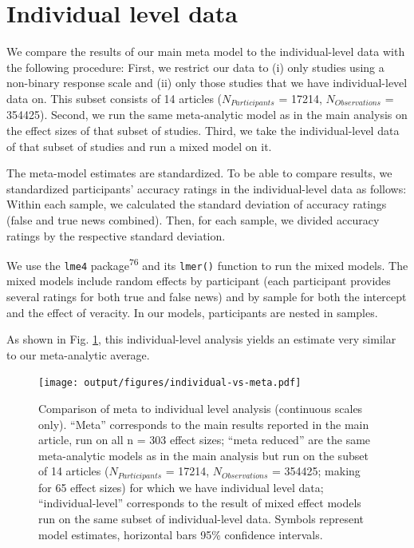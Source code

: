 \documentclass[
  doc,floatsintext]{apa6}
\begin{document}
\FloatBarrier

\clearpage

\section{Individual level data}\label{individual-level}

\FloatBarrier

We compare the results of our main meta model to the individual-level data with the following procedure: First, we restrict our data to (i) only studies using a non-binary response scale and (ii) only those studies that we have individual-level data on. This subset consists of 14 articles (\(N_{Participants}\) = 17214, \(N_{Observations}\) = 354425). Second, we run the same meta-analytic model as in the main analysis on the effect sizes of that subset of studies. Third, we take the individual-level data of that subset of studies and run a mixed model on it.

The meta-model estimates are standardized. To be able to compare results, we standardized participants' accuracy ratings in the individual-level data as follows: Within each sample, we calculated the standard deviation of accuracy ratings (false and true news combined). Then, for each sample, we divided accuracy ratings by the respective standard deviation.

We use the \texttt{lme4} package\textsuperscript{76} and its \texttt{lmer()} function to run the mixed models. The mixed models include random effects by participant (each participant provides several ratings for both true and false news) and by sample for both the intercept and the effect of veracity. In our models, participants are nested in samples.

As shown in Fig. \ref{fig:individual-vs-meta}, this individual-level analysis yields an estimate very similar to our meta-analytic average.



\begin{figure}
\centering
\texttt{[image: output/figures/individual-vs-meta.pdf]}
\caption{\label{fig:individual-vs-meta}Comparison of meta to individual level analysis (continuous scales only). ``Meta'' corresponds to the main results reported in the main article, run on all n = 303 effect sizes; ``meta reduced'' are the same meta-analytic models as in the main analysis but run on the subset of 14 articles (\(N_{Participants}\) = 17214, \(N_{Observations}\) = 354425; making for 65 effect sizes) for which we have individual level data; ``individual-level'' corresponds to the result of mixed effect models run on the same subset of individual-level data. Symbols represent model estimates, horizontal bars 95\% confidence intervals.}
\end{figure}
\end{document}
